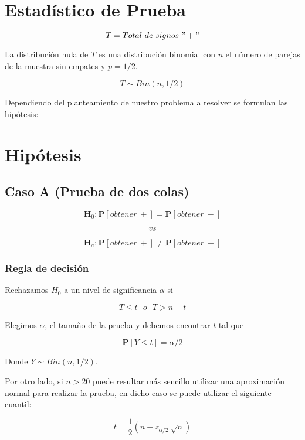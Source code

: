 \documentclass[
  a4paper,
  oneside,
  openany]{book}
\begin{document}
\hypertarget{estaduxedstico-de-prueba-2}{%
\section{Estadístico de Prueba}\label{estaduxedstico-de-prueba-2}}

\[T=Total\ de\ signos\ "+"\]

La distribución nula de \(T\) es una distribución binomial con \(n\) el número de parejas de la muestra sin empates y \(p=1/2\).

\[T\sim Bin(n,1/2)\]

Dependiendo del planteamiento de nuestro problema a resolver se formulan las hipótesis:

\hypertarget{hipuxf3tesis-2}{%
\section{Hipótesis}\label{hipuxf3tesis-2}}

\hypertarget{caso-a-prueba-de-dos-colas-2}{%
\subsection*{Caso A (Prueba de dos colas)}\label{caso-a-prueba-de-dos-colas-2}}


\[\textbf{H}_0: \mathbf{P}[obtener\ +]= \mathbf{P}[obtener\ -]\]

\[vs\]

\[\textbf{H}_a: \mathbf{P}[obtener\ +] \neq \mathbf{P}[obtener\ -]\]

\hypertarget{regla-de-decisiuxf3n-6}{%
\subsubsection*{Regla de decisión}\label{regla-de-decisiuxf3n-6}}


Rechazamos \(H_0\) a un nivel de significancia \(\alpha\) si

\[T \leq t \ \ \  o \ \ \ T>n-t\]

Elegimos \(\alpha\), el tamaño de la prueba y debemos encontrar \(t\) tal que

\[\mathbf{P}[Y \leq t]=\alpha/2\]

Donde \(Y \sim Bin (n,1/2)\).

Por otro lado, si \(n>20\) puede resultar más sencillo utilizar una aproximación normal para realizar la prueba, en dicho caso se puede utilizar el siguiente cuantil:

\[t=\frac{1}{2}\left(n+z_{\alpha/2}\ \sqrt{n}\right)\]
\end{document}
